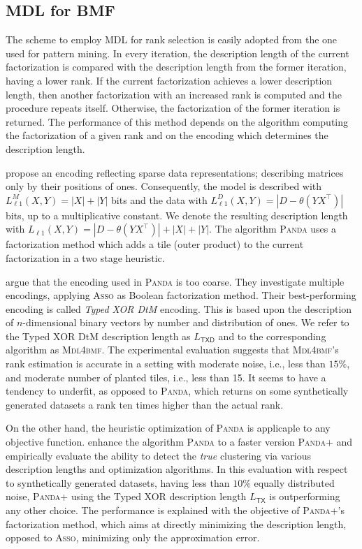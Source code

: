 \subsection{MDL for BMF}
The scheme to employ MDL for rank selection is easily adopted from the one used for pattern mining. 
In every iteration, the description length of the current factorization is compared with the description length from the former iteration, having a lower rank. If the current factorization achieves a lower description length, then another factorization with an increased rank is computed and the procedure repeats itself. Otherwise, the factorization of the former iteration is returned. The performance of this method depends on the algorithm computing the factorization of a given rank and on the encoding which determines the description length.

\cite{lucchese2010noise} propose an encoding reflecting sparse data representations; describing matrices only by their positions of ones. Consequently, the model is described with $L^M_{\ell 1}(X,Y)=|X|+|Y|$ bits and the data with $L^D_{\ell 1}(X,Y)=|D-\theta(YX^\top )|$ bits, up to a multiplicative constant. We denote the resulting description length with $L_{\ell 1}(X,Y)=|D-\theta(YX^\top )|+|X|+|Y|$. The algorithm \textsc{Panda} uses a factorization method which adds a tile (outer product) to the current factorization in a two stage heuristic. 
 
\cite{miettinen2014mdl4bmf} argue that the encoding used in \textsc{Panda} is too coarse. They investigate multiple encodings, applying \textsc{Asso} as Boolean factorization method. Their best-performing encoding is called \emph{Typed XOR DtM} encoding. This is based upon the description of $n$-dimensional binary vectors by number and distribution of ones. 
We refer to  the Typed XOR DtM description length as $L_{\mathsf{TXD}}$ and to the corresponding algorithm as \textsc{Mdl4bmf}. The experimental evaluation suggests that \textsc{Mdl4bmf}'s rank estimation is accurate in a setting with moderate noise, i.e., less than $15\%$, and moderate number of planted tiles, i.e., less than 15. It seems to have a tendency to underfit, as opposed to \textsc{Panda}, which returns on some synthetically generated datasets a rank ten times higher than the actual rank.

On the other hand, the heuristic optimization of \textsc{Panda} is applicaple to any objective function. \cite{lucchese2014unifying} enhance the algorithm \textsc{Panda} to a faster version \textsc{Panda+} and empirically evaluate the ability to detect the \emph{true} clustering via various description lengths and optimization algorithms. In this evaluation with respect to synthetically generated datasets, having less than $10\%$ equally distributed noise, \textsc{Panda+} using the Typed XOR description length $L_{\mathsf{TX}}$ is outperforming any other choice. The performance is explained with the objective of \textsc{Panda+}'s factorization method, which aims at directly minimizing the description length, opposed to \textsc{Asso}, minimizing only the approximation error.

